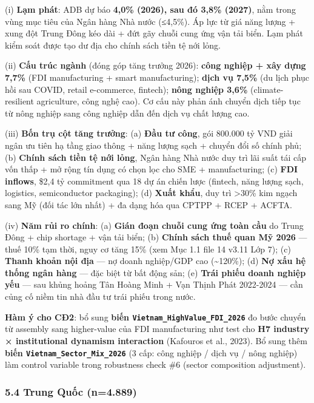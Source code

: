 \documentclass[12pt,a4paper]{article}
\begin{document}
(i) \textbf{Lạm phát}: ADB dự báo \textbf{4,0\% (2026), sau đó 3,8\%
(2027)}, nằm trong vùng mục tiêu của Ngân hàng Nhà nước (≤4,5\%). Áp lực
từ giá năng lượng + xung đột Trung Đông kéo dài + đứt gãy chuỗi cung ứng
vận tải biển. Lạm phát kiểm soát được tạo dư địa cho chính sách tiền tệ
nới lỏng.

(ii) \textbf{Cấu trúc ngành} (đóng góp tăng trưởng 2026): \textbf{công
nghiệp + xây dựng 7,7\%} (FDI manufacturing + smart manufacturing);
\textbf{dịch vụ 7,5\%} (du lịch phục hồi sau COVID, retail e-commerce,
fintech); \textbf{nông nghiệp 3,6\%} (climate-resilient agriculture,
công nghệ cao). Cơ cấu này phản ánh chuyển dịch tiếp tục từ nông nghiệp
sang công nghiệp dẫn đến dịch vụ chất lượng cao.

(iii) \textbf{Bốn trụ cột tăng trưởng}: (a) \textbf{Đầu tư công}, gói
800.000 tỷ VND giải ngân ưu tiên hạ tầng giao thông + năng lượng sạch +
chuyển đổi số chính phủ; (b) \textbf{Chính sách tiền tệ nới lỏng}, Ngân
hàng Nhà nước duy trì lãi suất tái cấp vốn thấp + mở rộng tín dụng có
chọn lọc cho SME + manufacturing; (c) \textbf{FDI inflows}, \$2,4 tỷ
commitment qua 18 dự án chiến lược (fintech, năng lượng sạch, logistics,
semiconductor packaging); (d) \textbf{Xuất khẩu}, duy trì
\textgreater30\% kim ngạch sang Mỹ (đối tác lớn nhất) + đa dạng hóa qua
CPTPP + RCEP + ACFTA.

(iv) \textbf{Năm rủi ro chính}: (a) \textbf{Gián đoạn chuỗi cung ứng
toàn cầu} do Trung Đông + chip shortage + vận tải biển; (b)
\textbf{Chính sách thuế quan Mỹ 2026} --- thuế 10\% tạm thời, nguy cơ
tăng 15\% (xem Mục 1.1 file 14 v3.11 Lớp 7); (c) \textbf{Thanh khoản nội
địa} --- nợ doanh nghiệp/GDP cao (\textasciitilde120\%); (d) \textbf{Nợ
xấu hệ thống ngân hàng} --- đặc biệt từ bất động sản; (e) \textbf{Trái
phiếu doanh nghiệp yếu} --- sau khủng hoảng Tân Hoàng Minh + Vạn Thịnh
Phát 2022-2024 --- cần củng cố niềm tin nhà đầu tư trái phiếu trong
nước.

\textbf{Hàm ý cho CĐ2}: bổ sung \textbf{biến
\texttt{Vietnam\_HighValue\_FDI\_2026}} đo bước chuyển từ assembly sang
higher-value của FDI manufacturing như test cho \textbf{H7 industry ×
institutional dynamism interaction} (Kafouros et al., 2023). Bổ sung
thêm \textbf{biến \texttt{Vietnam\_Sector\_Mix\_2026}} (3 cấp: công
nghiệp / dịch vụ / nông nghiệp) làm control variable trong robustness
check \#6 (sector composition adjustment).

\hypertarget{54-trung-quux1ed1c-n4889}{%
\subsubsection{5.4 Trung Quốc
(n=4.889)}\label{54-trung-quux1ed1c-n4889}}
\end{document}
